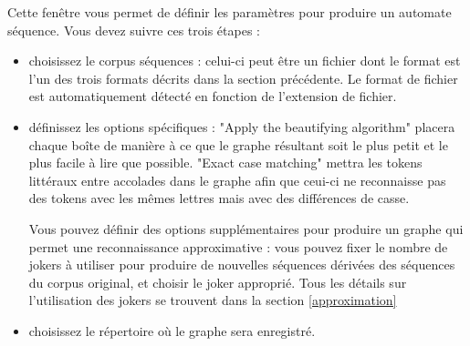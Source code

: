Cette fenêtre vous permet de définir les paramètres pour produire un automate séquence.
Vous devez suivre ces trois étapes :
\begin{itemize}
\item choisissez le corpus séquences : celui-ci peut être un fichier dont le format est l'un des trois formats décrits dans la section précédente. Le format de fichier est automatiquement détecté en fonction de l'extension de fichier.

\item définissez les options spécifiques :
"Apply the beautifying algorithm" placera chaque boîte de manière à ce que le graphe résultant soit
le plus petit et le plus facile à lire que possible.
"Exact case matching" mettra les tokens littéraux entre accolades dans le graphe afin que ceui-ci ne
reconnaisse pas des tokens avec les mêmes lettres mais avec des différences de casse.

Vous pouvez définir des options supplémentaires pour produire un graphe qui permet une
reconnaissance approximative : vous pouvez fixer le nombre de jokers à utiliser pour produire de
nouvelles séquences dérivées des séquences du corpus original, et choisir le joker approprié. Tous les détails sur l'utilisation des jokers se trouvent dans la section
\ref{approximation}

\item choisissez le répertoire où le graphe sera enregistré.
\end{itemize}
\medskip

